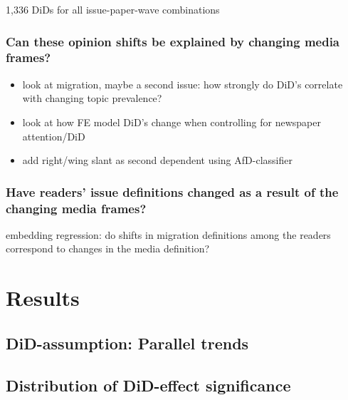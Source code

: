 \documentclass{article}
\begin{document}
1,336 DiDs for all issue-paper-wave combinations

\subsubsection{Can these opinion shifts be explained by changing media frames?}

\begin{itemize}
    \item look at migration, maybe a second issue: how strongly do DiD's correlate with changing topic prevalence?
    \item look at how FE model DiD's change when controlling for newspaper attention/DiD
    \item add right/wing slant as second dependent using AfD-classifier
\end{itemize}


\subsubsection{Have readers' issue definitions changed as a result of the changing media frames?}

embedding regression: do shifts in migration definitions among the readers correspond to changes in the media definition?

\section{Results}

\subsection{DiD-assumption: Parallel trends}



\subsection{Distribution of DiD-effect significance}

\end{document}
